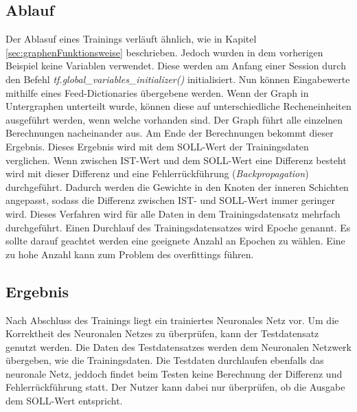 \subsection{Ablauf}
\label{sec:ablauf}
Der Ablasuf eines Trainings verläuft ähnlich, wie in Kapitel \ref{sec:graphenFunktionsweise} beschrieben. Jedoch wurden in dem vorherigen Beispiel keine Variablen verwendet. Diese werden am Anfang einer Session durch den Befehl \textit{tf.global\_variables\_initializer()} initialisiert. Nun können Eingabewerte mithilfe eines Feed-Dictionaries übergebene werden. Wenn der Graph in Untergraphen unterteilt wurde, können diese auf unterschiedliche Recheneinheiten ausgeführt werden, wenn welche vorhanden sind. Der Graph führt alle einzelnen Berechnungen nacheinander aus. Am Ende der Berechnungen bekommt dieser Ergebnis. Dieses Ergebnis wird mit dem SOLL-Wert der Trainingsdaten verglichen. Wenn zwischen IST-Wert und dem SOLL-Wert eine Differenz besteht wird mit dieser Differenz und eine Fehlerrückführung (\textit{Backpropagation}) durchgeführt. Dadurch werden die Gewichte in den Knoten der inneren Schichten angepasst, sodass die Differenz zwischen IST- und SOLL-Wert immer geringer wird. Dieses Verfahren wird für alle Daten in dem Trainingsdatensatz mehrfach durchgeführt. Einen Durchlauf des Trainingsdatensatzes wird Epoche genannt. Es sollte darauf geachtet werden eine geeignete Anzahl an Epochen zu wählen. Eine zu hohe Anzahl kann zum Problem des overfittings führen.

\subsection{Ergebnis}
\label{sec:ergebnis}
Nach Abschluss des Trainings liegt ein trainiertes Neuronales Netz vor. Um die Korrektheit des Neuronalen Netzes zu überprüfen, kann der Testdatensatz genutzt werden. Die Daten des Testdatensatzes werden dem Neuronalen Netzwerk übergeben, wie die Trainingsdaten. Die Testdaten durchlaufen ebenfalls das neuronale Netz, jeddoch findet beim Testen keine Berechnung der Differenz und Fehlerrückführung statt. Der Nutzer kann dabei nur überprüfen, ob die Ausgabe dem SOLL-Wert entspricht. 

